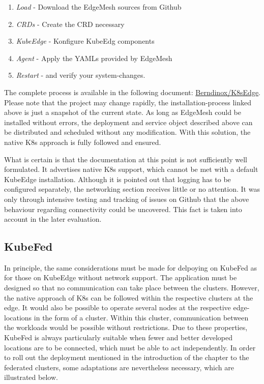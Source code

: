 \documentclass[MSC,Master,english]{twbook}%
\begin{document}
\begin{enumerate}
    \item \textit{Load} - Download the EdgeMesh sources from Github
    \item \textit{CRDs} - Create the \ac{CRD} necessary
    \item \textit{KubeEdge} - Konfigure KubeEdg components
    \item \textit{Agent} - Apply the YAMLs provided by EdgeMesh
    \item \textit{Restart} - and verify your system-changes.
\end{enumerate}

The complete process is available in the following document: \hyperref{https://github.com/Berndinox/K8sEdge/blob/main/DOCs/kubeedge-edgemesh.md}{}{}{Berndinox/K8sEdge}\cite{bk-gh-edgemesh}. Please note that the project may change rapidly, the installation-process linked above is just a snapshot of the current state.  As long as EdgeMesh could be installed without errors, the deployment and service object described above can be distributed and scheduled without any modification. With this solution, the native \ac{K8s} approach is fully followed and ensured.\medbreak

What is certain is that the documentation at this point is not sufficiently well formulated. It advertises native \ac{K8s} support, which cannot be met with a default KubeEdge installation. Although it is pointed out that logging has to be configured separately, the networking section receives little or no attention. It was only through intensive testing and tracking of issues on Github that the above behaviour regarding connectivity could be uncovered. This fact is taken into account in the later evaluation.

\subsection{KubeFed} In principle, the same considerations must be made for delpoying on KubeFed as for those on KubeEdge without network support. The application must be designed so that no communication can take place between the clusters. However, the native approach of \ac{K8s} can be followed within the respective clusters at the edge. It would also be possible to operate several nodes at the respective edge-locations in the form of a cluster. Within this cluster, communication between the workloads would be possible without restrictions. Due to these properties, KubeFed is always particularly suitable when fewer and better developed locations are to be connected, which must be able to act independently. In order to roll out the deployment mentioned in the introduction of the chapter to the federated clusters, some adaptations are nevertheless necessary, which are illustrated below. 
\end{document}
